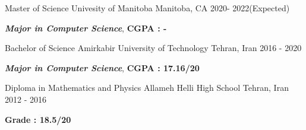 \documentclass[11pt, a4paper]{awesome-cv}
\begin{document}
\begin{cventries}
	\cventry
	{Master of Science} %
	{Univesity of Manitoba} %
	{Manitoba, CA} %
	{ 2020- 2022(Expected)} %
	{
		\begin{cvitems} %
			\item {\textit{\textbf{Major in Computer Science}}, \textbf{CGPA : -}}
		\end{cvitems}
	}
	\cventry
	{Bachelor of Science} %
	{Amirkabir University of Technology} %
	{Tehran, Iran} %
	{ 2016 - 2020} %
	{
		\begin{cvitems} %
			\item {\textit{\textbf{Major in Computer Science}}, \textbf{CGPA : 17.16/20}}
		\end{cvitems}
	}
	\cventry
	{Diploma in Mathematics and Physics} %
	{Allameh Helli High School} %
	{Tehran, Iran} %
	{ 2012 - 2016} %
	{    
		\begin{cvitems} %
			\item {\textbf{Grade : 18.5/20}}\\
		\end{cvitems}
	}
\end{cventries}

\end{document}

